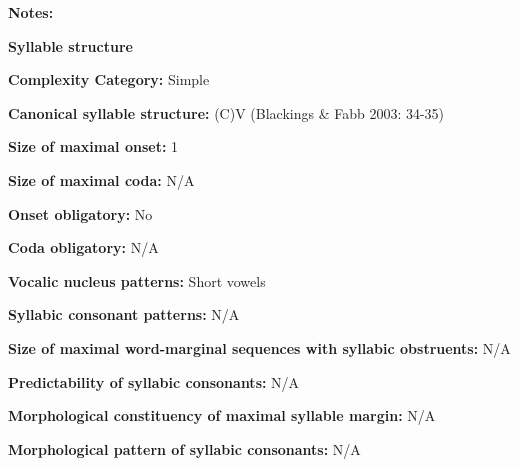 \begin{styleBody}
\textbf{Notes:}
\end{styleBody}

\begin{styleBody}
\textbf{Syllable structure}
\end{styleBody}

\begin{styleBody}
\textbf{Complexity Category:} Simple
\end{styleBody}

\begin{styleBody}
\textbf{Canonical syllable structure:} (C)V (Blackings \& Fabb 2003: 34-35)
\end{styleBody}

\begin{styleBody}
\textbf{Size of maximal onset:} 1
\end{styleBody}

\begin{styleBody}
\textbf{Size of maximal coda: }N/A
\end{styleBody}

\begin{styleBody}
\textbf{Onset obligatory:} No
\end{styleBody}

\begin{styleBody}
\textbf{Coda obligatory:} N/A
\end{styleBody}

\begin{styleBody}
\textbf{Vocalic nucleus patterns: }Short vowels
\end{styleBody}

\begin{styleBody}
\textbf{Syllabic consonant patterns:} N/A
\end{styleBody}

\begin{styleBody}
\textbf{Size of maximal word{}-marginal sequences with syllabic obstruents:} N/A
\end{styleBody}

\begin{styleBody}
\textbf{Predictability of syllabic consonants:} N/A
\end{styleBody}

\begin{styleBody}
\textbf{Morphological constituency of maximal syllable margin:} N/A
\end{styleBody}

\begin{styleBody}
\textbf{Morphological pattern of syllabic consonants:} N/A
\end{styleBody}

